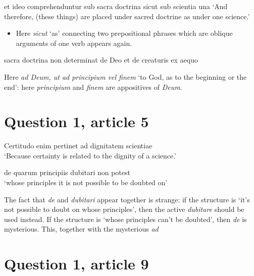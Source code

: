 \documentclass[a4paper, 12pt]{article}
\newcommand{\form}[1]{\emph{#1}}
\newcommand{\translate}[1]{`#1'}
\begin{document}
\begin{exe}
    \ex et ideo comprehenduntur sub sacra doctrina sicut sub scientia una
    \translate{And therefore, (these things) are placed under sacred doctrine as under one science.}
\end{exe}

\begin{itemize}
    \item Here \form{sicut} \translate{as} connecting two prepositional phrases 
    which are oblique arguments of one verb appears again.
\end{itemize}

\begin{exe}
    \ex sacra doctrina non determinat de Deo et de creaturis ex aequo
\end{exe}

\begin{exe}
    \ex Here \form{ad Deum, ut ad principium vel finem} 
    \translate{to God, as to the beginning or the end}: 
    here \form{principium} and \form{finem} are appositives of \form{Deum}.
\end{exe}

\section{Question 1, article 5}

\begin{exe}
    \ex Certitudo enim pertinet ad dignitatem scientiae \\
    \translate{Because certainty is related to the dignity of a science.}
\end{exe}

\begin{exe}
    \ex de quarum principiis dubitari non potest \\ 
    \translate{whose principles it is not possible to be doubted on}
\end{exe}

The fact that \form{de} and \form{dubitari} appear together is strange:
if the structure is \translate{it's not possible to doubt on whose principles}, 
then the active \form{dubitare} should be used instead.
If the structure is \translate{whose principles can't be doubted}, 
then \form{de} is mysterious.
This, together with the mysterious \form{ad }

\section{Question 1, article 9}
\end{document}
